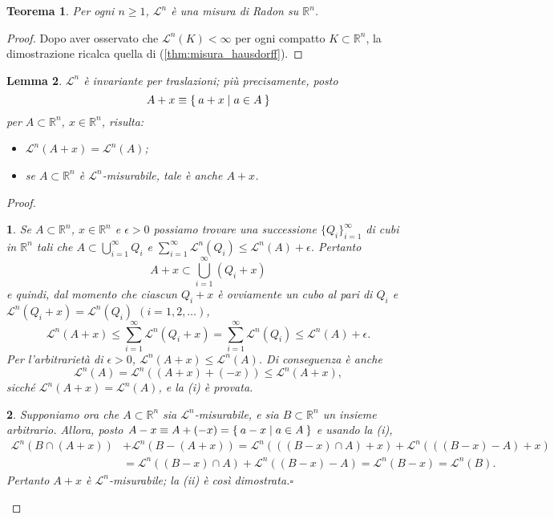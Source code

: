 \documentclass[a4paper,10pt,openright,oneside]{book}
\theoremstyle{theoremstyle}
\newtheorem{teorema}{Teorema}[section]
\newtheorem{lemma}[teorema]{Lemma}
\theoremstyle{theoremstylewoheader}
\theoremstyle{theoremstyle}
\theoremstyle{proofsecstyle}
\newtheorem{proofsec}{}
\theoremstyle{nonumberplain}
\newtheorem{proof}{Dim.}
\newcommand{\RR}{\ensuremath{\mathbb{R}}}
\newcommand{\Leb}{\ensuremath{\mathcal{L}}}
\renewcommand{\qedsymbol}{\ensuremath{\square}}
\newcommand{\qed}{\unskip\nobreak\hfill\nobreak\hspace{.5em}\qedsymbol}
\begin{document}
\begin{teorema}
Per ogni $n \ge 1$, $\Leb^n$ è una misura di Radon su $\RR^n$.
\end{teorema}

\begin{proof}
Dopo aver osservato che $\Leb^n(K) < \infty$ per ogni compatto $K \subset \RR^n$, la dimostrazione ricalca quella di (\ref{thm:misura_hausdorff}).
\end{proof}

\begin{lemma}
\label{pro:misura_di_lebesgue_invariante_per_traslazioni}
$\Leb^n$ è invariante per traslazioni; più precisamente, posto
\[
A + x \equiv \Set{ a + x | a \in A }
\]
per $A \subset \RR^n$, $x \in \RR^n$, risulta:
\begin{itemize}
\item[(i)] $\Leb^n(A + x) = \Leb^n(A)$;
\item[(ii)] se $A \subset \RR^n$ è $\Leb^n$-misurabile, tale è anche $A + x$.
\end{itemize}
\end{lemma}

\begin{proof}
\begin{proofsec}
Se $A \subset \RR^n$, $x \in \RR^n$ e $\epsilon > 0$ possiamo trovare una successione $\{Q_i\}_{i=1}^\infty$ di cubi in $\RR^n$ tali che $A \subset \bigcup_{i=1}^\infty Q_i$ e $\sum_{i=1}^\infty \Leb^n(Q_i) \le \Leb^n(A) + \epsilon$. Pertanto
\[
A + x \subset \bigcup_{i=1}^\infty (Q_i + x)
\]
e quindi, dal momento che ciascun $Q_i + x$ è ovviamente un cubo al pari di $Q_i$ e $\Leb^n(Q_i + x) = \Leb^n(Q_i)$ $(i = 1, 2, \ldots)$,
\[
\Leb^n(A + x) \le \sum_{i=1}^\infty \Leb^n(Q_i + x) = \sum_{i=1}^\infty \Leb^n(Q_i) \le \Leb^n(A) + \epsilon.
\]
Per l'arbitrarietà di $\epsilon > 0$, $\Leb^n(A + x) \le \Leb^n(A)$. Di conseguenza è anche
\[
\Leb^n(A) = \Leb^n((A + x) + (-x)) \le \Leb^n(A + x),
\]
sicché $\Leb^n(A + x) = \Leb^n(A)$, e la (i) è provata.
\end{proofsec}

\begin{proofsec}
Supponiamo ora che $A \subset \RR^n$ sia $\Leb^n$-misurabile, e sia $B \subset \RR^n$ un insieme arbitrario. Allora, posto $A - x \equiv A + (-x) = \Set{ a - x | a \in A }$ e usando la (i),
\[
\begin{split}
\Leb^n(B \cap (A + x)) &+ \Leb^n(B - (A + x)) = \Leb^n(((B - x) \cap A) + x) + \Leb^n(((B - x) - A) + x)\\
&= \Leb^n((B - x) \cap A) + \Leb^n((B - x) - A) = \Leb^n(B - x) = \Leb^n(B).
\end{split}
\]
Pertanto $A + x$ è $\Leb^n$-misurabile; la (ii) è così dimostrata.\qed
\end{proofsec}
\end{proof}
\end{document}

